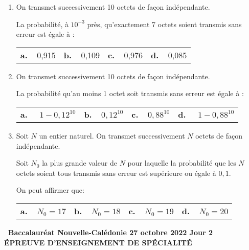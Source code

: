\documentclass[10pt,a4paper]{article}
\begin{document}
\begin{enumerate}[resume]
\item On transmet successivement 10 octets de façon indépendante.

La probabilité, à $10^{-3}$ près, qu'exactement 7 octets soient transmis sans erreur est égale à :

\begin{center}
\begin{tabularx}{\linewidth}{*{4}{X}}
\textbf{a.~~}0,915 &\textbf{b.~~}0,109 &\textbf{c.~~}0,976 &\textbf{d.~~}0,085
\end{tabularx}
\end{center}
\item On transmet successivement 10 octets de façon indépendante.

La probabilité qu'au moins 1 octet soit transmis sans erreur est égale à :

\begin{center}
\begin{tabularx}{\linewidth}{*{4}{X}}
\textbf{a.~~} $1 - 0,12^{10}$ &\textbf{b.~~}$0,12^{10}$ &\textbf{c.~~}$0,88^{10}$ &\textbf{d.~~} $1- 0,88^{10}$
\end{tabularx}
\end{center}
\item Soit $N$ un entier naturel. On transmet successivement $N$ octets de façon indépendante. 

Soit $N_0$ la plus grande valeur de $N$ pour laquelle la probabilité que les $N$ octets soient tous transmis sans erreur est supérieure ou égale à $0,1$.

On peut affirmer que:

\begin{center}
\begin{tabularx}{\linewidth}{*{4}{X}}
\textbf{a.~~}$N_0 = 17$ &\textbf{b.~~}$N_0 = 18$ &\textbf{c.~~}$N_0 = 19$ &\textbf{d.~~}$N_0 = 20$
\end{tabularx}
\end{center}
\end{enumerate}
\newpage
\hypertarget{NCaledo2}{}

\label{NCaledo2}

\pagestyle{fancy}
\thispagestyle{empty}

\begin{center}{\Large\textbf{\decofourleft~Baccalauréat Nouvelle-Calédonie 27 octobre 2022 Jour 2~\decofourright\\[7pt] ÉPREUVE D'ENSEIGNEMENT DE SPÉCIALITÉ}}
\end{center}
\end{document}
